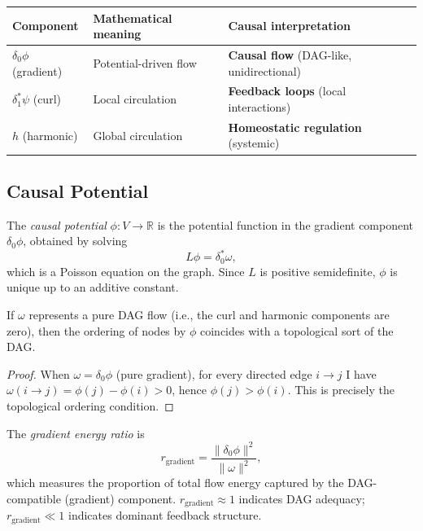 \documentclass[twoside,11pt]{article}
\newcommand{\R}{\mathbb{R}}
\begin{document}
\begin{center}
\begin{tabular}{lll}
\toprule
Component & Mathematical meaning & Causal interpretation \\
\midrule
$\delta_0\phi$ (gradient) & Potential-driven flow &
  \textbf{Causal flow} (DAG-like, unidirectional) \\
$\delta_1^*\psi$ (curl) & Local circulation &
  \textbf{Feedback loops} (local interactions) \\
$h$ (harmonic) & Global circulation &
  \textbf{Homeostatic regulation} (systemic) \\
\bottomrule
\end{tabular}
\end{center}

\subsection{Causal Potential}

\begin{definition}
\label{def:causal-potential}
The \emph{causal potential} $\phi:V\to\R$ is the potential function in
the gradient component $\delta_0\phi$, obtained by solving
\begin{equation}
\label{eq:poisson}
  L\phi = \delta_0^*\omega,
\end{equation}
which is a Poisson equation on the graph.  Since $L$ is positive
semidefinite, $\phi$ is unique up to an additive constant.
\end{definition}

\begin{proposition}
\label{prop:potential-toposort}
If $\omega$ represents a pure DAG flow (i.e., the curl and harmonic
components are zero), then the ordering of nodes by $\phi$ coincides
with a topological sort of the DAG.
\end{proposition}

\begin{proof}
When $\omega=\delta_0\phi$ (pure gradient), for every directed edge
$i\to j$ I have $\omega(i\to j)=\phi(j)-\phi(i)>0$, hence
$\phi(j)>\phi(i)$.  This is precisely the topological ordering
condition.
\end{proof}

\begin{definition}
\label{def:gradient-ratio}
The \emph{gradient energy ratio} is
\begin{equation}
\label{eq:r-gradient}
  r_{\mathrm{gradient}} = \frac{\|\delta_0\phi\|^2}{\|\omega\|^2},
\end{equation}
which measures the proportion of total flow energy captured by the
DAG-compatible (gradient) component.  $r_{\mathrm{gradient}}\approx 1$
indicates DAG adequacy; $r_{\mathrm{gradient}}\ll 1$ indicates
dominant feedback structure.
\end{definition}
\end{document}
